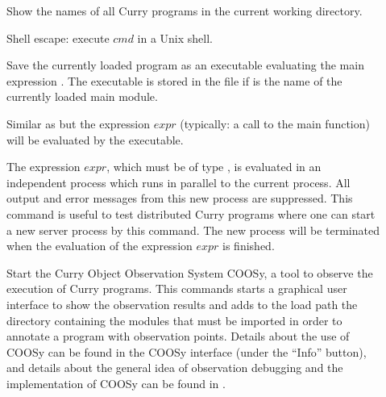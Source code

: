 \begin{description}
\item[] Show the names of all Curry programs
in the current working directory.

\item[] Shell escape: execute $cmd$ in a Unix shell.

\item[] Save the currently loaded
program as an executable evaluating the main expression .
The executable is stored in the file 
if  is the name of the currently loaded main module.

\item[] Similar as 
but the expression $expr$ (typically: a call to the main
function) will be evaluated by the executable.

\item[]
The expression $expr$, which must be of type ,
is evaluated in an independent process which runs in
parallel to the current \CYS process.
All output and error messages from this new process are suppressed.
This command is useful to test distributed Curry programs
where one can start
a new server process by this command. The new process
will be terminated when the evaluation of the expression $expr$
is finished.

\item[]
Start the Curry Object Observation System COOSy,
a tool to observe the execution of Curry programs.
This commands starts a graphical user interface to show
the observation results and adds to the load path the directory
containing the modules that must be imported in order to annotate
a program with observation points.
Details about the use of COOSy can be found in the
COOSy interface (under the ``Info'' button), and details
about the general idea of observation debugging and the implementation
of COOSy can be found in \cite{BrasselChitilHanusHuch04PADL}.



\end{description}
